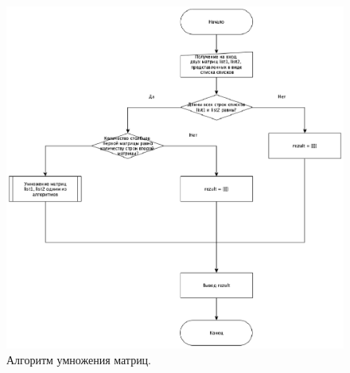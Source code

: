 \documentclass[12pt]{report}
\begin{document}
	\begin{figure}[H]
		\centering
		\includegraphics[width=1.2\linewidth]{Standard}
		\caption{Алгоритм умножения матриц.}
		\label{ris:image2}
	\end{figure}

\newpage
\end{document}
